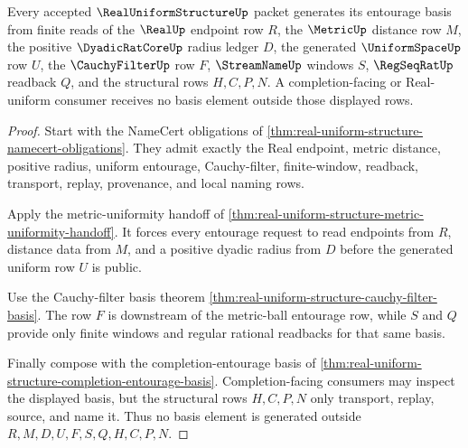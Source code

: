 \begin{theorem}
\label{thm:real-uniform-structure-finite-entourage-basis}
Every accepted $\RealUniformStructureUp$ packet generates its entourage basis from finite reads of the $\RealUp$ endpoint row $R$, the $\MetricUp$ distance row $M$, the positive $\DyadicRatCoreUp$ radius ledger $D$, the generated $\UniformSpaceUp$ row $U$, the $\CauchyFilterUp$ row $F$, $\StreamNameUp$ windows $S$, $\RegSeqRatUp$ readback $Q$, and the structural rows $H,C,P,N$. A completion-facing or Real-uniform consumer receives no basis element outside those displayed rows.
\end{theorem}
\begin{proof}
Start with the NameCert obligations of \autoref{thm:real-uniform-structure-namecert-obligations}. They admit exactly the Real endpoint, metric distance, positive radius, uniform entourage, Cauchy-filter, finite-window, readback, transport, replay, provenance, and local naming rows.

Apply the metric-uniformity handoff of \autoref{thm:real-uniform-structure-metric-uniformity-handoff}. It forces every entourage request to read endpoints from $R$, distance data from $M$, and a positive dyadic radius from $D$ before the generated uniform row $U$ is public.

Use the Cauchy-filter basis theorem \autoref{thm:real-uniform-structure-cauchy-filter-basis}. The row $F$ is downstream of the metric-ball entourage row, while $S$ and $Q$ provide only finite windows and regular rational readbacks for that same basis.

Finally compose with the completion-entourage basis of \autoref{thm:real-uniform-structure-completion-entourage-basis}. Completion-facing consumers may inspect the displayed basis, but the structural rows $H,C,P,N$ only transport, replay, source, and name it. Thus no basis element is generated outside $R,M,D,U,F,S,Q,H,C,P,N$.
\end{proof}

